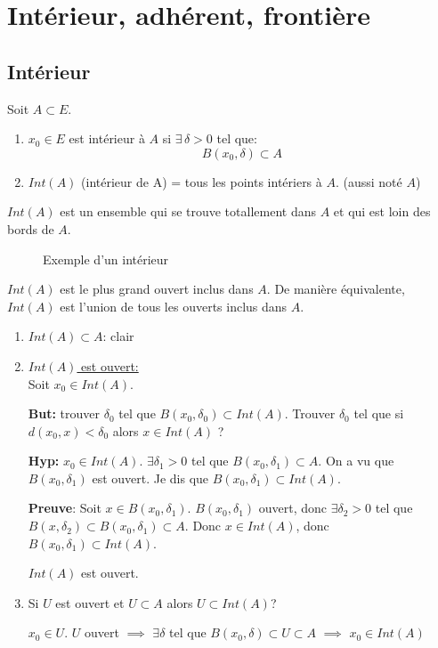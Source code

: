 \section{Intérieur, adhérent, frontière}
\subsection{Intérieur}
\begin{definition}
    Soit $A \subset E$.
    \begin{enumerate}
        \item $x_0 \in E$ est intérieur à $A$ si  $\exists \, \delta > 0$ tel que:
            \[
            B(x_0, \delta) \subset A
            \] 
        \item $Int(A)$ (intérieur de A) = tous les points intériers à  $A$. (aussi noté $A$)
    \end{enumerate}
\end{definition}
\begin{intuition}
   $Int(A)$ est un ensemble qui se trouve totallement dans $A$ et qui est loin des bords de  $A$.
\end{intuition}
\begin{figure}[ht]
    \centering
    \caption{Exemple d'un intérieur}
    \label{fig:interieur-exemple}
\end{figure}
\begin{prop}
   $Int(A)$ est le plus grand ouvert inclus dans  $A$. De manière équivalente, $Int(A)$ est l'union de tous les ouverts inclus dans  $A$.
\end{prop}
\begin{preuve}
   \begin{enumerate}
       \item $Int(A) \subset A$: clair
       \item \underline{$Int(A)$ est ouvert:} \\
           Soit $x_0 \in Int(A)$. 
           \par
           \textbf{But:} trouver $\delta_0$ tel que  $B(x_0, \delta_0) \subset Int(A)$. Trouver $\delta_0$ tel que si $d(x_0, x) < \delta_0$ alors $x \in Int(A)$ ?
           \par
           \textbf{Hyp:}  $x_0 \in Int(A)$. $\exists \delta_1 > 0$ tel que $B(x_0, \delta_1) \subset A$. On a vu que $B(x_0, \delta_1)$ est ouvert.
           Je dis que $B(x_0, \delta_1) \subset Int(A)$.
           \par
           \textbf{Preuve}: Soit $x \in B(x_0, \delta_1)$. $B(x_0, \delta_1)$ ouvert, donc $\exists \delta_2 > 0$ tel que $B(x, \delta_2) \subset B(x_0, \delta_1) \subset A$. Donc $x \in Int(A)$, donc  $B(x_0, \delta_1) \subset Int(A)$.\par
           $Int(A)$ est ouvert.
       \item Si $U$ est ouvert et  $U \subset A$ alors $U \subset Int(A)$?
           \par
           $x_0 \in U$. $U$ ouvert  $\implies$ $\exists \delta$ tel que $B(x_0, \delta) \subset U \subset A$ $\implies$ $x_0 \in Int(A)$
   \end{enumerate} 
\end{preuve}

